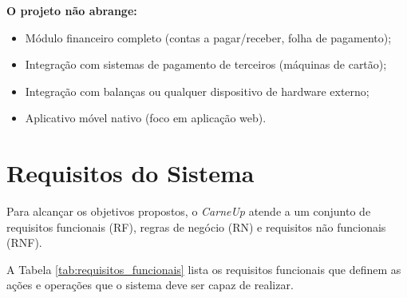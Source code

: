 \documentclass[
	12pt,				%
	openany,			%
	oneside,			%
	a4paper,			%
	english,			%
	french,				%
	spanish,			%
	brazil				%
	]{abntex2}
\begin{document}
\noindent\textbf{O projeto não abrange:}
\begin{itemize}
    \item Módulo financeiro completo (contas a pagar/receber, folha de pagamento);
    \item Integração com sistemas de pagamento de terceiros (máquinas de cartão);
    \item Integração com balanças ou qualquer dispositivo de hardware externo;
    \item Aplicativo móvel nativo (foco em aplicação web).
\end{itemize}

\section{Requisitos do Sistema}

Para alcançar os objetivos propostos, o \textit{CarneUp} atende a um conjunto de requisitos funcionais (RF), regras de negócio (RN) e requisitos não funcionais (RNF).

A Tabela \ref{tab:requisitos_funcionais} lista os requisitos funcionais que definem as ações e operações que o sistema deve ser capaz de realizar.
\end{document}

